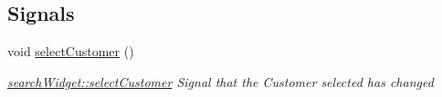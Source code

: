 \subsection*{Signals}
\begin{DoxyCompactItemize}
\item 
\hypertarget{classGui_1_1Widgets_1_1searchWidget_a9b6248c515bac4b6f58237c2f73d804b}{}void \hyperlink{classGui_1_1Widgets_1_1searchWidget_a9b6248c515bac4b6f58237c2f73d804b}{select\+Customer} ()\label{classGui_1_1Widgets_1_1searchWidget_a9b6248c515bac4b6f58237c2f73d804b}

\begin{DoxyCompactList}\small\item\em \hyperlink{classGui_1_1Widgets_1_1searchWidget_a96ba18927785257377dcd3701d41e8d1}{search\+Widget\+::select\+Customer} Signal that the Customer selected has changed \end{DoxyCompactList}\end{DoxyCompactItemize}
